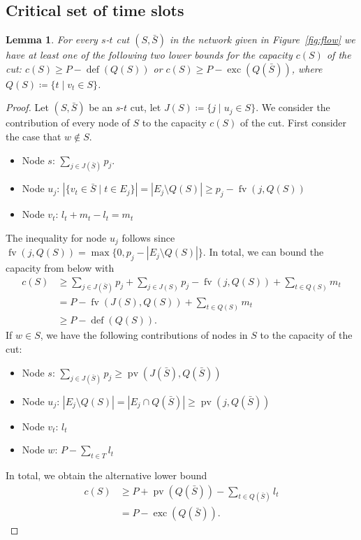 \documentclass[a4paper]{article}
\DeclareMathOperator{\fv}{fv}
\DeclareMathOperator{\pv}{pv}
\DeclareMathOperator{\opdef}{def}
\DeclareMathOperator{\exc}{exc}
\newtheorem{lemma}[theorem]{Lemma}
\begin{document}
\subsection{Critical set of time slots}
\begin{lemma}\label{lemma:cut}
  For every $s$-$t$ cut $(S, \bar S)$ in the network given in Figure~\ref{fig:flow} we have at least one of the following two lower bounds for the capacity $c(S)$ of the cut:
  $c(S) \geq P - \opdef(Q(S))$ or $c(S) \geq P - \exc(Q(\bar S))$, where $Q(S) \coloneqq \{ t \mid v_t \in S \}$.
\end{lemma}
\begin{proof}
  Let $(S, \bar S)$ be an $s$-$t$ cut, let $J(S) \coloneqq \{j \mid u_j \in S\}$.
  We consider the contribution of every node of $S$ to the capacity $c(S)$ of the cut.
  First consider the case that $w \notin S$.
  \begin{itemize}
    \item Node $s$: $\sum_{j \in J(\bar S)} p_j$.
    \item Node $u_j$: $|\{v_t \in \bar S \mid t \in E_j\}| = | E_j \setminus Q(S) | \geq p_j - \fv(j, Q(S))$
    \item Node $v_t$: $l_t + m_t - l_t = m_t$
  \end{itemize}
  The inequality for node $u_j$ follows since $\fv(j, Q(S)) = \max \{0, p_j - |E_j \setminus Q(S)| \}$.
  In total, we can bound the capacity from below with
  \begin{align}
    c(S) &\geq \sum_{j \in J(\bar S)} p_j + \sum_{j \in J(S)} p_j - \fv(j, Q(S)) + \sum_{t \in Q(S)} m_t
    \\ &= P - \fv(J(S), Q(S)) + \sum_{t \in Q(S)} m_t
    \\ &\geq P - \opdef(Q(S))\text{.}
  \end{align}
  If $w \in S$, we have the following contributions of nodes in $S$ to the capacity of the cut:
  \begin{itemize}
    \item Node $s$: $\sum_{j \in J(\bar S)} p_j \geq \pv(J(\bar S), Q(\bar S))$
    \item Node $u_j$: $| E_j \setminus Q(S) |
      = | E_j \cap Q(\bar S)| \geq \pv(j, Q(\bar S))$
    \item Node $v_t$: $l_t$
    \item Node $w$: $P - \sum_{t \in T} l_t$
  \end{itemize}
  In total, we obtain the alternative lower bound
  \begin{align}
    c(S) &\geq P + \pv(Q(\bar S))
    - \sum_{t \in Q(\bar S)} l_t
    \\ &= P - \exc(Q(\bar S)) \text{.}
  \end{align}

\end{proof}
\end{document}
